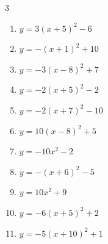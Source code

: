 \begin{multicols}{3}
\begin{enumerate}
        \phantom{$\displaystyle 頂点\left( 5 , -3 \right)$}

  \item $\displaystyle y=3\left( x+5\right)^{2}-6$

        \phantom{$\displaystyle 頂点\left( -5 , -6 \right)$}

  \item $\displaystyle y=-\left( x+1\right)^{2}+10$

        \phantom{$\displaystyle 頂点\left( -1 , 10 \right)$}

  \item $\displaystyle y=-3\left( x-8\right)^{2}+7$

        \phantom{$\displaystyle 頂点\left( 8 , 7 \right)$}

  \item $\displaystyle y=-2\left( x+5\right)^{2}-2$

        \phantom{$\displaystyle 頂点\left( -5 , -2 \right)$}

  \item $\displaystyle y=-2\left( x+7\right)^{2}-10$

        \phantom{$\displaystyle 頂点\left( -7 , -10 \right)$}

  \item $\displaystyle y=10\left( x-8\right)^{2}+5$

        \phantom{$\displaystyle 頂点\left( 8 , 5 \right)$}

  \item $\displaystyle y=-10x^{2}-2$

        \phantom{$\displaystyle 頂点\left( 0 , -2 \right)$}

  \item $\displaystyle y=-\left( x+6\right)^{2}-5$

        \phantom{$\displaystyle 頂点\left( -6 , -5 \right)$}

  \item $\displaystyle y=10x^{2}+9$

        \phantom{$\displaystyle 頂点\left( 0 , 9 \right)$}

  \item $\displaystyle y=-6\left( x+5\right)^{2}+2$

        \phantom{$\displaystyle 頂点\left( -5 , 2 \right)$}

  \item $\displaystyle y=-5\left( x+10\right)^{2}+1$

        \phantom{$\displaystyle 頂点\left( -10 , 1 \right)$}


\end{enumerate}
\end{multicols}
